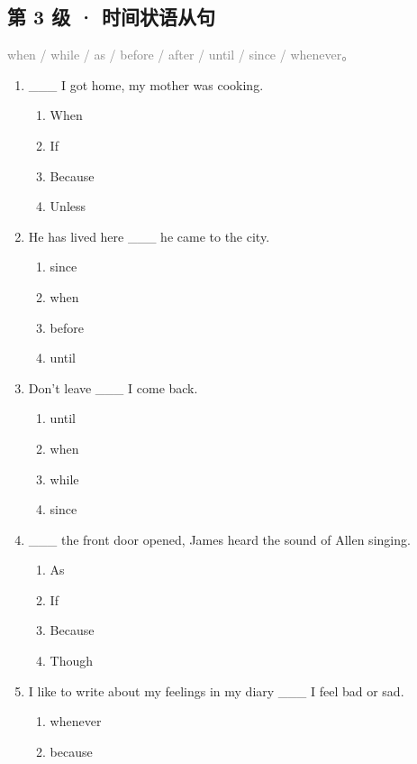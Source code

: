 \documentclass[11pt,a4paper]{ctexart}
\begin{document}
\subsection*{第 3 级 · 时间状语从句}
\noindent\textcolor{gray}{when / while / as / before / after / until / since / whenever。}\par\smallskip
\begin{enumerate}[leftmargin=*,itemsep=4pt]
\item \_\_\_ I got home, my mother was cooking.
\begin{enumerate}[label=\Alph*.,leftmargin=2em,itemsep=1pt,topsep=2pt]
\item When
\item If
\item Because
\item Unless
\end{enumerate}
\item He has lived here \_\_\_ he came to the city.
\begin{enumerate}[label=\Alph*.,leftmargin=2em,itemsep=1pt,topsep=2pt]
\item since
\item when
\item before
\item until
\end{enumerate}
\item Don’t leave \_\_\_ I come back.
\begin{enumerate}[label=\Alph*.,leftmargin=2em,itemsep=1pt,topsep=2pt]
\item until
\item when
\item while
\item since
\end{enumerate}
\item \_\_\_ the front door opened, James heard the sound of Allen singing.
\begin{enumerate}[label=\Alph*.,leftmargin=2em,itemsep=1pt,topsep=2pt]
\item As
\item If
\item Because
\item Though
\end{enumerate}
\item I like to write about my feelings in my diary \_\_\_ I feel bad or sad.
\begin{enumerate}[label=\Alph*.,leftmargin=2em,itemsep=1pt,topsep=2pt]
\item whenever
\item because

\end{enumerate}
\end{enumerate}
\end{document}
